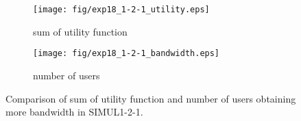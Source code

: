 	\begin{figure}
		\begin{center}
			\begin{subfigure}[b]{0.8\textwidth}
				\centering
				\texttt{[image: fig/exp18\_1-2-1\_utility.eps]}
				\caption{sum of utility function}
				\label{figure:simul1_2_1_u_a}
			\end{subfigure}
			\begin{subfigure}[b]{0.8\textwidth}
				\centering
				\texttt{[image: fig/exp18\_1-2-1\_bandwidth.eps]}
				\caption{number of users}
				\label{figure:simul1_2_1_u_b}
			\end{subfigure}
			\caption{Comparison of sum of utility function and number of users obtaining more bandwidth in SIMUL1-2-1.}
			\label{figure:simul1_2_1_u}
		\end{center}
	\end{figure}

\clearpage


